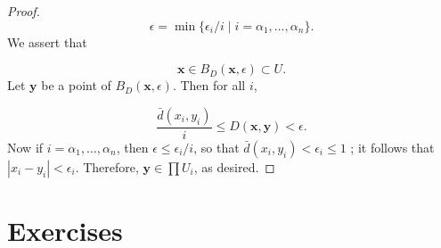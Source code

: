 \begin{proof}
 \[
 \epsilon = \min \{ {{\epsilon }_{i}/i \mid i = {\alpha }_{1},\ldots,{\alpha }_{n}}\}.
 \]
 We assert that

 \[
 \mathbf{x} \in {B}_{D}( {\mathbf{x},\epsilon }) \subset U\text{.}
 \]
 Let \(\mathbf{y}\) be a point of \(B_{D}( {\mathbf{x},\epsilon })\). Then for all \(i\),

 \[
 \frac{\bar{d}( {x_{i},y_{i}}) }{i} \leq D( {\mathbf{x},\mathbf{y}}) < \epsilon .
 \]
 Now if \(i = {\alpha }_{1},\ldots,{\alpha }_{n}\), then \(\epsilon \leq {\epsilon }_{i}/i\), so that \(\bar{d}( {x_{i},y_{i}}) < {\epsilon }_{i} \leq 1\) ; it follows that \(| {x_{i} - y_{i}}| < {\epsilon }_{i}\). Therefore, \(\mathbf{y} \in \prod {U}_{i}\), as desired.
\end{proof}

\section*{Exercises}

